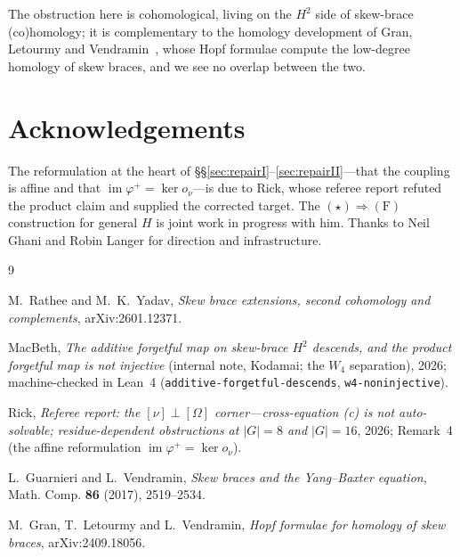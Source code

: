 \documentclass[11pt,reqno]{amsart}
\theoremstyle{plain}
\theoremstyle{definition}
\newcommand{\im}{\operatorname{im}}
\begin{document}
The obstruction here is cohomological, living on the $H^2$ side of skew-brace
(co)homology; it is complementary to the homology development of Gran, Letourmy and
Vendramin~\cite{GLV}, whose Hopf formulae compute the low-degree homology of skew braces,
and we see no overlap between the two.

\section*{Acknowledgements}
The reformulation at the heart of \S\S\ref{sec:repairI}--\ref{sec:repairII}---that the
coupling is affine and that $\im\varphi^{+}=\ker o_\nu$---is due to Rick, whose referee
report refuted the product claim and supplied the corrected target. The
$(\star)\Rightarrow\mathrm{(F)}$ construction for general $H$ is joint work in progress with
him. Thanks to Neil Ghani and Robin Langer for direction and infrastructure.

\begin{thebibliography}{9}

M.~Rathee and M.~K.~Yadav,
\emph{Skew brace extensions, second cohomology and complements},
arXiv:2601.12371.

MacBeth,
\emph{The additive forgetful map on skew-brace $H^2$ descends, and the product forgetful map
is not injective} (internal note, Kodamai; the $W_4$ separation), 2026;
machine-checked in Lean~4 (\texttt{additive-forgetful-descends}, \texttt{w4-noninjective}).

Rick,
\emph{Referee report: the $[\nu]\perp[\Omega]$ corner---cross-equation (c) is not
auto-solvable; residue-dependent obstructions at $|G|=8$ and $|G|=16$}, 2026;
Remark~4 (the affine reformulation $\im\varphi^{+}=\ker o_\nu$).

L.~Guarnieri and L.~Vendramin,
\emph{Skew braces and the Yang--Baxter equation},
Math. Comp. \textbf{86} (2017), 2519--2534.

M.~Gran, T.~Letourmy and L.~Vendramin,
\emph{Hopf formulae for homology of skew braces},
arXiv:2409.18056.

\end{thebibliography}
\end{document}
